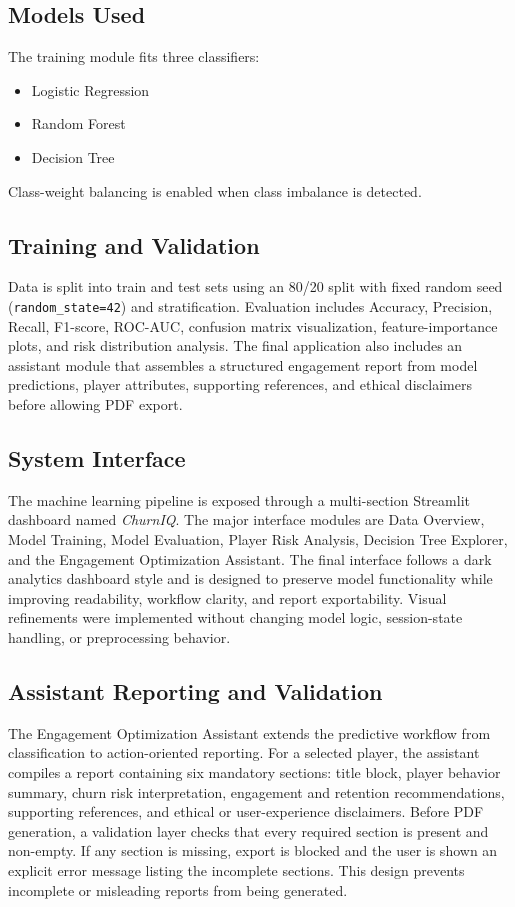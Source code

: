 \documentclass[conference]{IEEEtran}
\begin{document}
\subsection{Models Used}
The training module fits three classifiers:
\begin{itemize}
    \item Logistic Regression
    \item Random Forest
    \item Decision Tree
\end{itemize}
Class-weight balancing is enabled when class imbalance is detected.

\subsection{Training and Validation}
Data is split into train and test sets using an 80/20 split with fixed random seed (\texttt{random\_state=42}) and stratification. Evaluation includes Accuracy, Precision, Recall, F1-score, ROC-AUC, confusion matrix visualization, feature-importance plots, and risk distribution analysis. The final application also includes an assistant module that assembles a structured engagement report from model predictions, player attributes, supporting references, and ethical disclaimers before allowing PDF export.

\subsection{System Interface}
The machine learning pipeline is exposed through a multi-section Streamlit dashboard named \textit{ChurnIQ}. The major interface modules are Data Overview, Model Training, Model Evaluation, Player Risk Analysis, Decision Tree Explorer, and the Engagement Optimization Assistant. The final interface follows a dark analytics dashboard style and is designed to preserve model functionality while improving readability, workflow clarity, and report exportability. Visual refinements were implemented without changing model logic, session-state handling, or preprocessing behavior.

\subsection{Assistant Reporting and Validation}
The Engagement Optimization Assistant extends the predictive workflow from classification to action-oriented reporting. For a selected player, the assistant compiles a report containing six mandatory sections: title block, player behavior summary, churn risk interpretation, engagement and retention recommendations, supporting references, and ethical or user-experience disclaimers. Before PDF generation, a validation layer checks that every required section is present and non-empty. If any section is missing, export is blocked and the user is shown an explicit error message listing the incomplete sections. This design prevents incomplete or misleading reports from being generated.
\end{document}
